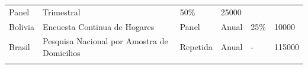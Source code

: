 \begin{longtable}[]{@{}llllll@{}}
\begin{minipage}[t]{0.06\columnwidth}
Panel\strut
\end{minipage} & \begin{minipage}[t]{0.08\columnwidth}\raggedright
Trimestral\strut
\end{minipage} & \begin{minipage}[t]{0.06\columnwidth}\raggedright
50\%\strut
\end{minipage} & \begin{minipage}[t]{0.13\columnwidth}\raggedright
25000\strut
\end{minipage}\tabularnewline
\begin{minipage}[t]{0.13\columnwidth}\raggedright
Bolivia\strut
\end{minipage} & \begin{minipage}[t]{0.38\columnwidth}\raggedright
Encuesta Continua de Hogares\strut
\end{minipage} & \begin{minipage}[t]{0.06\columnwidth}\raggedright
Panel\strut
\end{minipage} & \begin{minipage}[t]{0.08\columnwidth}\raggedright
Anual\strut
\end{minipage} & \begin{minipage}[t]{0.06\columnwidth}\raggedright
25\%\strut
\end{minipage} & \begin{minipage}[t]{0.13\columnwidth}\raggedright
10000\strut
\end{minipage}\tabularnewline
\begin{minipage}[t]{0.13\columnwidth}\raggedright
Brasil\strut
\end{minipage} & \begin{minipage}[t]{0.38\columnwidth}\raggedright
Pesquisa Nacional por Amostra de Domicilios\strut
\end{minipage} & \begin{minipage}[t]{0.06\columnwidth}\raggedright
Repetida\strut
\end{minipage} & \begin{minipage}[t]{0.08\columnwidth}\raggedright
Anual\strut
\end{minipage} & \begin{minipage}[t]{0.06\columnwidth}\raggedright
-\strut
\end{minipage} & \begin{minipage}[t]{0.13\columnwidth}\raggedright
115000\strut
\end{minipage}\tabularnewline
\begin{minipage}[t]{0.13\columnwidth}\raggedright

\end{minipage}
\end{longtable}
